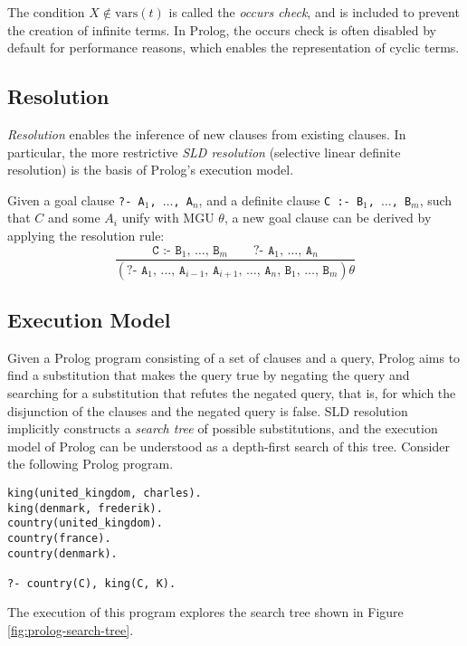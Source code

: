 The condition $X \notin \text{vars}(t)$ is called the \emph{occurs check}, and is included to prevent the creation of infinite terms. In Prolog, the occurs check is often disabled by default for performance reasons, which enables the representation of cyclic terms.

\subsection{Resolution}

\emph{Resolution} enables the inference of new clauses from existing clauses. In particular, the more restrictive \emph{SLD resolution} (selective linear definite resolution) is the basis of Prolog's execution model.

Given a goal clause \texttt{?- A$_1$, $\ldots$, A$_n$}, and a definite clause \texttt{C :- B$_1$, $\ldots$, B$_m$}, such that $C$ and some $A_i$ unify with MGU $\theta$, a new goal clause can be derived by applying the resolution rule:
$$
\frac{\texttt{C :- B$_1$, $\ldots$, B$_m$} \qquad \texttt{?- A$_1$, $\ldots$, A$_n$}}{(\texttt{?- A$_1$, $\ldots$, A$_{i-1}$, A$_{i+1}$, $\ldots$, A$_n$, B$_1$, $\ldots$, B$_m$})\theta}
$$

\subsection{Execution Model}

Given a Prolog program consisting of a set of clauses and a query, Prolog aims to find a substitution that makes the query true by negating the query and searching for a substitution that refutes the negated query, that is, for which the disjunction of the clauses and the negated query is false. SLD resolution implicitly constructs a \emph{search tree} of possible substitutions, and the execution model of Prolog can be understood as a depth-first search of this tree. Consider the following Prolog program.

\begin{center}
\begin{verbatim}
king(united_kingdom, charles).
king(denmark, frederik).
country(united_kingdom).
country(france).
country(denmark).

?- country(C), king(C, K).
\end{verbatim}
\end{center}

The execution of this program explores the search tree shown in Figure \ref{fig:prolog-search-tree}.

